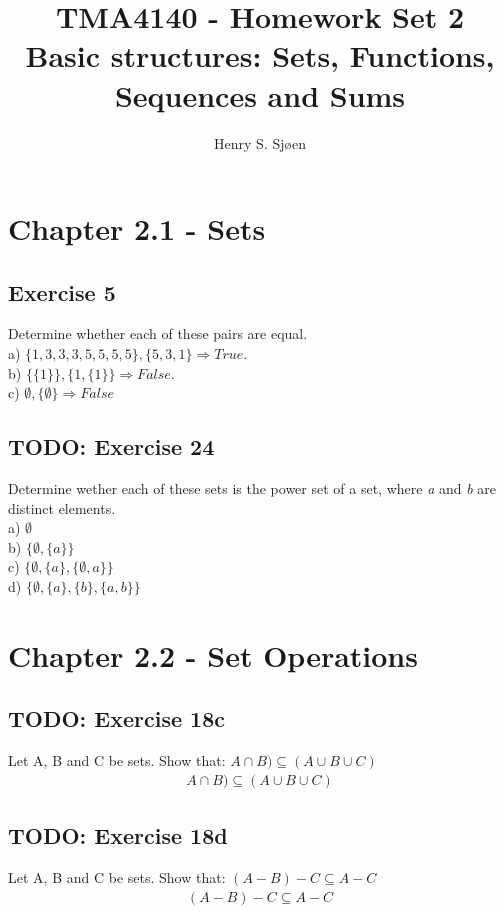 \documentclass[12pt]{article}
\author{Henry S. Sjøen}
\title{%
  \textbf{TMA4140 - Homework Set 2}\\
  Basic structures: Sets, Functions, Sequences and Sums\\
    \color{darkred}{\textbf{RETTES}}
  }
\begin{document}
    \maketitle \thispagestyle{empty}
    \tableofcontents
      
    \pagebreak
    \section{Chapter 2.1 - Sets}
    \subsection{Exercise 5}
    Determine whether each of these pairs are equal.\\
        a) $\{1,3,3,3,5,5,5,5\},\{5,3,1\} \Rightarrow True$.\\
        b) $\{\{1\}\},\{1,\{1\}\} \Rightarrow False.$\\
        c) $\emptyset,\{\emptyset\} \Rightarrow False$
   
    \subsection{TODO: Exercise 24}
    Determine wether each of these sets is the power set of a set, where \emph{a} and \emph{b} are distinct elements.\\
        a) $\emptyset$\\
        b) $\{\emptyset,\{a\}\}$\\
        c) $\{\emptyset, \{a\},\{\emptyset,a\}\}$\\
        d) $\{\emptyset,\{a\},\{b\},\{a,b\}\}$

    \pagebreak     
    \section{Chapter 2.2 - Set Operations}
    \subsection{TODO: Exercise 18c}
    Let A, B and C be sets. Show that:
    $A \cap B) \subseteq (A \cup B \cup C)$
    \begin{equation}
        \begin{split}
            A \cap B) \subseteq (A \cup B \cup C)
        \end{split}
    \end{equation}
    \subsection{TODO: Exercise 18d}
    Let A, B and C be sets. Show that:
    $(A - B) - C \subseteq A - C$
    \begin{equation}
        \begin{split}
            (A - B) - C \subseteq A - C
        \end{split}
    \end{equation}
\end{document}
